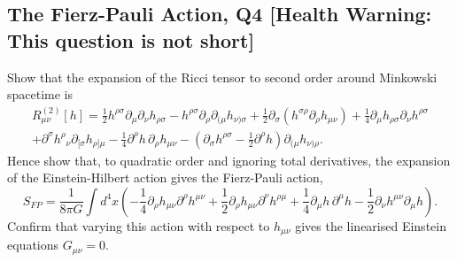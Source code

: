\subsection{The Fierz-Pauli Action, Q4 [Health Warning: This question is not short]}

Show that the expansion of the Ricci tensor to second order around Minkowski spacetime is
\begin{equation}
\begin{aligned}
    R^{(2)}_{\mu\nu}[h] = \frac{1}{2}h^{\rho\sigma}\partial_\mu\partial_\nu h_{\rho\sigma} - h^{\rho\sigma}\partial_\rho\partial_{(\mu}h_{\nu)\sigma} + \frac{1}{2}\partial_\sigma(h^{\sigma\rho}\partial_\rho h_{\mu\nu}) + \frac{1}{4}\partial_\mu h_{\rho\sigma}\partial_\nu h^{\rho\sigma}\\
    + \partial^\sigma h^\rho{}_\nu\partial_{[\sigma}h_{\rho]\mu} - \frac{1}{4}\partial^\rho h\,\partial_\rho h_{\mu\nu} - \left(\partial_\sigma h^{\rho\sigma} - \frac{1}{2}\partial^\rho h\right)\partial_{(\mu}h_{\nu)\rho}.
\end{aligned}
\end{equation}
Hence show that, to quadratic order and ignoring total derivatives, the expansion of the Einstein-Hilbert action gives the Fierz-Pauli action,
\begin{equation}
    S_{FP} = \frac{1}{8\pi G}\int d^4x\left(-\frac{1}{4}\partial_\rho h_{\mu\nu}\partial^\rho h^{\mu\nu} + \frac{1}{2}\partial_\rho h_{\mu\nu}\partial^\nu h^{\rho\mu} + \frac{1}{4}\partial_\mu h\,\partial^\mu h - \frac{1}{2}\partial_\nu h^{\mu\nu}\partial_\mu h\right).
\end{equation}
Confirm that varying this action with respect to $h_{\mu\nu}$ gives the linearised Einstein equations $G_{\mu\nu} = 0$.

